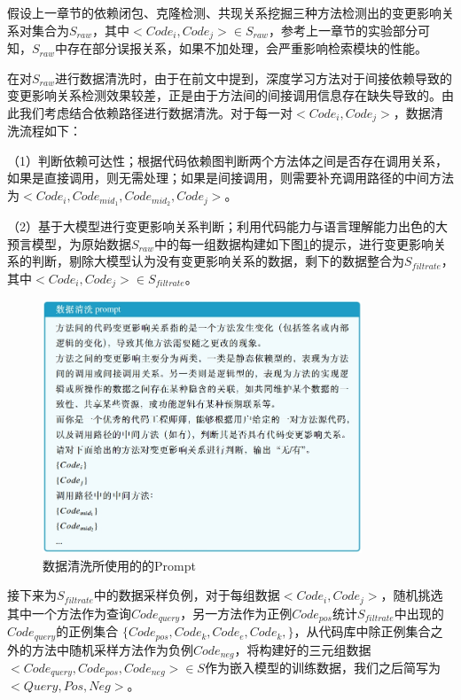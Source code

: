 假设上一章节的依赖闭包、克隆检测、共现关系挖掘三种方法检测出的变更影响关系对集合为$S_{raw}$，其中$<Code_i,Code_j>\in S_{raw}$，参考上一章节的实验部分可知，$S_{raw}$中存在部分误报关系，如果不加处理，会严重影响检索模块的性能。

在对$S_{raw}$进行数据清洗时，由于在前文中提到，深度学习方法对于间接依赖导致的变更影响关系检测效果较差，正是由于方法间的间接调用信息存在缺失导致的。由此我们考虑结合依赖路径进行数据清洗。对于每一对$<Code_i,Code_j>$，数据清洗流程如下：


（1）判断依赖可达性；根据代码依赖图判断两个方法体之间是否存在调用关系，如果是直接调用，则无需处理；如果是间接调用，则需要补充调用路径的中间方法为$<Code_i,Code_{mid_1},Code_{mid_2},Code_j>$。

（2）基于大模型进行变更影响关系判断；利用代码能力与语言理解能力出色的大预言模型，为原始数据$S_{raw}$中的每一组数据构建如下图\ref{2_数据清洗prompt}的提示，进行变更影响关系的判断，剔除大模型认为没有变更影响关系的数据，剩下的数据整合为$S_{filtrate}$，其中$<Code_i,Code_j>\in S_{filtrate}$。

\begin{figure}[htbp]
\centering
\includegraphics[width = 0.85\textwidth]{figures/2_数据清洗prompt.png}
\caption{数据清洗所使用的的Prompt}
\label{2_数据清洗prompt}
\end{figure}


接下来为$S_{filtrate}$中的数据采样负例，对于每组数据$<Code_i,Code_j>$，随机挑选其中一个方法作为查询$Code_{query}$，另一方法作为正例$Code_{pos}$统计$S_{filtrate}$中出现的$Code_{query}$的正例集合 $\{Code_{pos},Code_k,Code_e,Code_k,\}$，从代码库中除正例集合之外的方法中随机采样方法作为负例$Code_{neg}$，将构建好的三元组数据$<Code_{query},Code_{pos},Code_{neg}>\in S$作为嵌入模型的训练数据，我们之后简写为$<Query,Pos,Neg>$。

